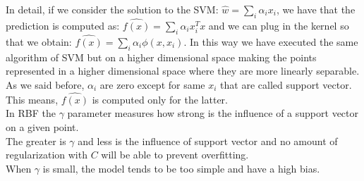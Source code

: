 \documentclass[LaM,binding=0.6cm]{sapthesis}
\begin{document}
In detail, if we consider the solution to the SVM: $\hat{w}=\sum_i\alpha_ix_i$, we have that the prediction is computed as: $\hat{f(x)}=\sum_i\alpha_ix_i^{T}x$ and we can plug in the kernel so that we obtain: $\hat{f(x)}=\sum_i\alpha_i\phi(x,x_i)$. In this way we have executed the same algorithm of SVM but on a higher dimensional space making the points represented in a higher dimensional space where they are more linearly separable.\\As we said before, $\alpha_i$ are zero except for same $x_i$ that are called support vector. This means, $\hat{f(x)}$ is computed only for the latter.\\In RBF the $\gamma$ parameter measures how strong is the influence of a support vector on a given point.\\The greater is $\gamma$ and less is the influence of support vector and no amount of regularization with $C$ will be able to prevent overfitting.\\When $\gamma$ is small, the model tends to be too simple and have a high bias.
\end{document}
